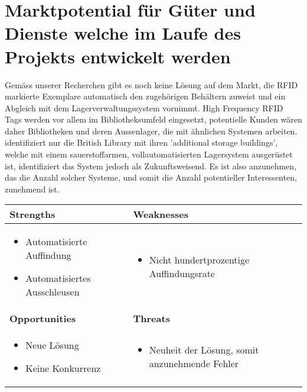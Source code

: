 \chapter{Marktpotential für Güter und Dienste welche im Laufe des Projekts entwickelt werden}

Gemäss unserer Recherchen gibt es noch keine Lösung auf dem Markt, die RFID markierte Exemplare automatisch den zugehörigen Behältern zuweist und ein Abgleich mit dem Lagerverwaltungssystem vornimmt. High Frequency RFID Tags werden vor allem im Bibliotheksumfeld eingesetzt, potentielle Kunden wären daher Bibliotheken und deren Aussenlager, die mit ähnlichen Systemen arbeiten. \citeauthor{Niederer2017} identifiziert nur die British Library mit ihren 'additional storage buildings', welche mit einem sauerstoffarmen, vollautomatisierten Lagersystem ausgerüstet ist, identifiziert das System jedoch als Zukunftsweisend. Es ist also anzunehmen, das die Anzahl solcher Systeme, und somit die Anzahl potentieller Interessenten, zunehmend ist.

\begin{table}[h!]
	\centering
	\begin{tabularx}{\textwidth}{|X|X|}
		\hline
		\textbf{Strengths} & \textbf{Weaknesses} \\
		\hline
		\begin{itemize}[noitemsep]
			\item Automatisierte Auffindung
			\item Automatisiertes Ausschleusen
		\end{itemize} & \begin{itemize}[noitemsep]
			\item Nicht hundertprozentige Auffindungsrate
		\end{itemize}
		\\
		\hline
		\textbf{Opportunities} & \textbf{Threats} \\
		\hline
		\begin{itemize}[noitemsep]
			\item Neue Lösung
			\item Keine Konkurrenz
		\end{itemize} & \begin{itemize}[noitemsep]
			\item Neuheit der Lösung, somit anzunehmende Fehler
		\end{itemize}
		\\
		\hline
	\end{tabularx}
\end{table}

